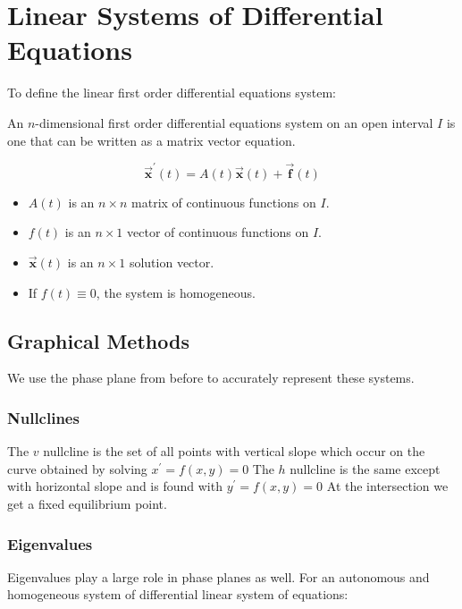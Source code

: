 \documentclass[12pt,landscape,twocolumn]{article}
\let\oldvec\vec
\renewcommand{\vec}[1]{\oldvec{\mathbf{ #1 } } }                    %
\begin{document}
\section{Linear Systems of Differential Equations}
To define the linear first order differential equations system:

An $n$-dimensional first order differential equations system on an open interval $I$ is one that can be written as a matrix vector equation.

    \begin{equation}\label{eq:desystem_vector_form}
        \vec{x} ^\prime (t) = A(t) \vec{x}(t) + \vec{f}(t)
    \end{equation}

    \begin{itemize}
        \item $A(t)$ is an $n \times n$ matrix of continuous functions on $I$.
        \item $f(t)$ is an $n \times 1$ vector of continuous functions on $I$.
        \item $\vec{x}(t)$ is an $n \times 1$ solution vector.
        \item If $f(t) \equiv 0$, the system is homogeneous.
    \end{itemize}

    \subsection{Graphical Methods}
    We use the phase plane from before to accurately represent these systems.

        \subsubsection{Nullclines}
        The $v$ nullcline is the set of all points with vertical slope which occur on the curve obtained by solving
            $
                x^\prime = f(x, y) = 0
            $
        The $h$ nullcline is the same except with horizontal slope and is found with
            $
                y^\prime = f(x, y) = 0
            $
        At the intersection we get a fixed equilibrium point.

        \subsubsection{Eigenvalues}
        Eigenvalues play a large role in phase planes as well. For an autonomous and homogeneous system of differential linear system of equations:
\end{document}
